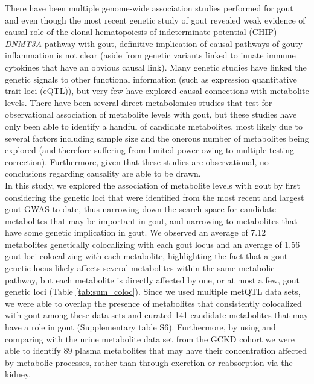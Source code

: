 \documentclass[a4paper,10pt]{article}
\begin{document}
\noindent
There have been multiple genome-wide association studies performed for gout\citep{tin_target_2019,major_genome-wide_2024,li_replication_2017,nakayama_subtype-specific_2020,kawamura_genome-wide_2019,zhou_global_2022} and even though the most recent genetic study of gout\citep{major_genome-wide_2024} revealed weak evidence of causal role of the clonal hema\-topoiesis of indeterminate potential (CHIP) \textit{DNMT3A} pathway with gout, definitive implication of causal pathways of gouty inflammation is not clear (aside from genetic variants linked to innate immune cytokines that have an obvious causal link)\citep{major_genome-wide_2024}.
Many genetic studies have linked the genetic signals to other functional information (such as expression quantitative trait loci (eQTL)), but very few have explored causal connections with metabolite levels.
There have been several direct metabolomics studies that test for observational association of metabolite levels with gout\citep{renaudin_gout_2020,lyu_metabolomics_2022,joshi_prediagnostic_2023}, but these studies have only been able to identify a handful of candidate metabolites, most likely due to several factors including sample size and the onerous number of metabolites being explored (and therefore suffering from limited power owing to multiple testing correction).
Furthermore, given that these studies are observational, no conclusions regarding causality are able to be drawn.
\\

In this study, we explored the association of metabolite levels with gout by first considering the genetic loci that were identified from the most recent and largest gout GWAS to date, thus narrowing down the search space for candidate metabolites that may be important in gout, and narrowing to metabolites that have some genetic implication in gout.
We observed an average of 7.12 metabolites genetically colocalizing with each gout locus and an average of 1.56 gout loci colocalizing with each metabolite, highlighting the fact that a gout genetic locus likely affects several metabolites within the same metabolic pathway, but each metabolite is directly affected by one, or at most a few, gout genetic loci (Table \ref{tab:sum_coloc}).
Since we used multiple metQTL data sets, we were able to overlap the presence of metabolites that consistently colocalized with gout among these data sets and curated 141 candidate metabolites that may have a role in gout (Supplementary table S6).
Furthermore, by using and comparing with the urine metabolite data set from the GCKD cohort we were able to identify 89 plasma metabolites that may have their concentration affected by metabolic processes, rather than through excretion or reabsorption via the kidney.
\\
\end{document}
